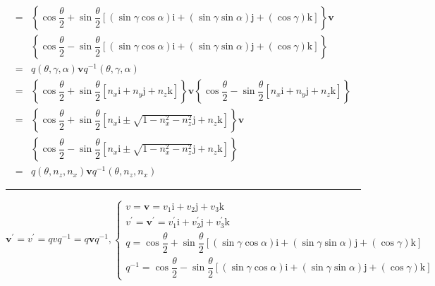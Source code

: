 \documentclass[
]{book}
\theoremstyle{definition}
\theoremstyle{definition}
\theoremstyle{definition}
\theoremstyle{definition}
\theoremstyle{remark}
\begin{document}
\[\begin{aligned}
= & \left\{ \cos\dfrac{\theta}{2}+\sin\dfrac{\theta}{2}\left[\left(\sin\gamma\cos\alpha\right)\mathrm{i}+\left(\sin\gamma\sin\alpha\right)\mathrm{j}+\left(\cos\gamma\right)\mathrm{k}\right]\right\} \boldsymbol{v}\\
 & \left\{ \cos\dfrac{\theta}{2}-\sin\dfrac{\theta}{2}\left[\left(\sin\gamma\cos\alpha\right)\mathrm{i}+\left(\sin\gamma\sin\alpha\right)\mathrm{j}+\left(\cos\gamma\right)\mathrm{k}\right]\right\} \\
= & q\left(\theta,\gamma,\alpha\right)\boldsymbol{v}q^{-1}\left(\theta,\gamma,\alpha\right)\\
= & \left\{ \cos\dfrac{\theta}{2}+\sin\dfrac{\theta}{2}\left[n_{{\scriptscriptstyle x}}\mathrm{i}+n_{{\scriptscriptstyle y}}\mathrm{j}+n_{{\scriptscriptstyle z}}\mathrm{k}\right]\right\} \boldsymbol{v}\left\{ \cos\dfrac{\theta}{2}-\sin\dfrac{\theta}{2}\left[n_{{\scriptscriptstyle x}}\mathrm{i}+n_{{\scriptscriptstyle y}}\mathrm{j}+n_{{\scriptscriptstyle z}}\mathrm{k}\right]\right\} \\
= & \left\{ \cos\dfrac{\theta}{2}+\sin\dfrac{\theta}{2}\left[n_{{\scriptscriptstyle x}}\mathrm{i}\pm\sqrt{1-n_{{\scriptscriptstyle x}}^{2}-n_{{\scriptscriptstyle z}}^{2}}\mathrm{j}+n_{{\scriptscriptstyle z}}\mathrm{k}\right]\right\} \boldsymbol{v}\\
 & \left\{ \cos\dfrac{\theta}{2}-\sin\dfrac{\theta}{2}\left[n_{{\scriptscriptstyle x}}\mathrm{i}\pm\sqrt{1-n_{{\scriptscriptstyle x}}^{2}-n_{{\scriptscriptstyle z}}^{2}}\mathrm{j}+n_{{\scriptscriptstyle z}}\mathrm{k}\right]\right\} \\
= & q\left(\theta,n_{{\scriptscriptstyle z}},n_{{\scriptscriptstyle x}}\right)\boldsymbol{v}q^{-1}\left(\theta,n_{{\scriptscriptstyle z}},n_{{\scriptscriptstyle x}}\right)
\end{aligned}
\]

\begin{center}\rule{0.5\linewidth}{0.5pt}\end{center}

\[
\boldsymbol{v}^{\prime}=v^{\prime}=qvq^{-1}=q\boldsymbol{v}q^{-1},\begin{cases}
v=\boldsymbol{v}=v_{{\scriptscriptstyle 1}}\mathrm{i}+v_{{\scriptscriptstyle 2}}\mathrm{j}+v_{{\scriptscriptstyle 3}}\mathrm{k}\\
v^{\prime}=\boldsymbol{v}^{\prime}=v_{{\scriptscriptstyle 1}}^{\prime}\mathrm{i}+v_{{\scriptscriptstyle 2}}^{\prime}\mathrm{j}+v_{{\scriptscriptstyle 3}}^{\prime}\mathrm{k}\\
q=\cos\dfrac{\theta}{2}+\sin\dfrac{\theta}{2}\left[\left(\sin\gamma\cos\alpha\right)\mathrm{i}+\left(\sin\gamma\sin\alpha\right)\mathrm{j}+\left(\cos\gamma\right)\mathrm{k}\right]\\
q^{-1}=\cos\dfrac{\theta}{2}-\sin\dfrac{\theta}{2}\left[\left(\sin\gamma\cos\alpha\right)\mathrm{i}+\left(\sin\gamma\sin\alpha\right)\mathrm{j}+\left(\cos\gamma\right)\mathrm{k}\right]
\end{cases}
\]
\end{document}
